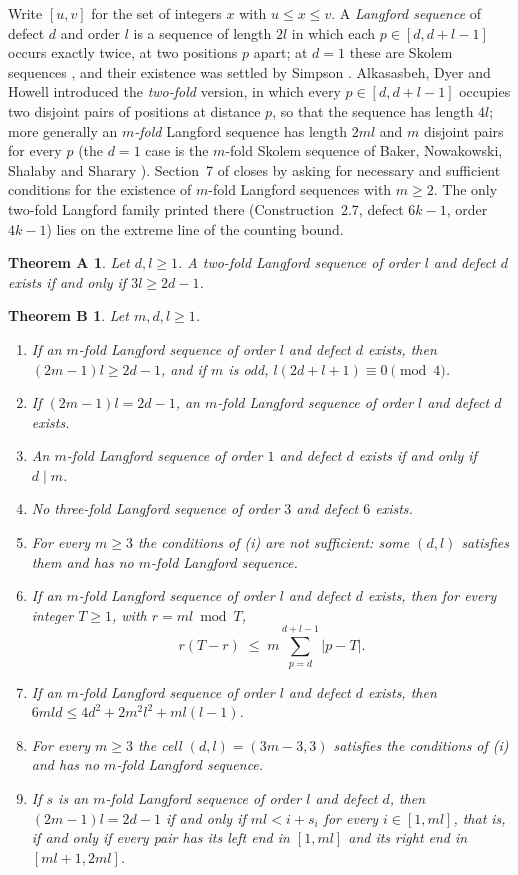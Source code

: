 \documentclass[11pt]{amsart}
\theoremstyle{plain}
\newtheorem*{thmA}{Theorem A}
\newtheorem*{thmB}{Theorem B}
\theoremstyle{definition}
\theoremstyle{remark}
\begin{document}
Write $[u,v]$ for the set of integers $x$ with $u \le x \le v$. A \emph{Langford
sequence} of defect $d$ and order $l$ is a sequence of length $2l$ in which each
$p \in [d,d+l-1]$ occurs exactly twice, at two positions $p$ apart; at $d = 1$ these are
Skolem sequences \cite{Skolem,OKeefe}, and their existence was settled by Simpson
\cite{Simpson}. Alkasasbeh, Dyer and Howell \cite{ADH} introduced the \emph{two-fold}
version, in which every $p \in [d,d+l-1]$ occupies two disjoint pairs of positions at
distance $p$, so that the sequence has length $4l$; more generally an \emph{$m$-fold}
Langford sequence has length $2ml$ and $m$ disjoint pairs for every $p$ (the $d = 1$ case
is the $m$-fold Skolem sequence of Baker, Nowakowski, Shalaby and Sharary \cite{BNSS}).
Section~7 of \cite{ADH} closes by asking for necessary and sufficient conditions for the
existence of $m$-fold Langford sequences with $m \ge 2$. The only
two-fold Langford family printed there (Construction~2.7, defect $6k-1$, order $4k-1$)
lies on the extreme line of the counting bound.

\begin{thmA}
Let $d, l \ge 1$. A two-fold Langford sequence of order $l$ and defect $d$ exists if and
only if $3l \ge 2d-1$.
\end{thmA}

\begin{thmB}
Let $m, d, l \ge 1$.
\begin{enumerate}
\item If an $m$-fold Langford sequence of order $l$ and defect $d$ exists, then
  $(2m-1)l \ge 2d-1$, and if $m$ is odd, $l(2d+l+1) \equiv 0 \pmod 4$.
\item If $(2m-1)l = 2d-1$, an $m$-fold Langford sequence of order $l$ and defect $d$
  exists.
\item An $m$-fold Langford sequence of order $1$ and defect $d$ exists if and only if
  $d \mid m$.
\item No three-fold Langford sequence of order $3$ and defect $6$ exists.
\item For every $m \ge 3$ the conditions of \textup{(i)} are not sufficient: some
  $(d,l)$ satisfies them and has no $m$-fold Langford sequence.
\item If an $m$-fold Langford sequence of order $l$ and defect $d$ exists, then for every
  integer $T \ge 1$, with $r = ml \bmod T$,
  \[
    r(T-r) \;\le\; m \sum_{p=d}^{d+l-1} |p - T| .
  \]
\item If an $m$-fold Langford sequence of order $l$ and defect $d$ exists, then
  $6mld \le 4d^2 + 2m^2l^2 + ml(l-1)$.
\item For every $m \ge 3$ the cell $(d,l) = (3m-3,3)$ satisfies the conditions of
  \textup{(i)} and has no $m$-fold Langford sequence.
\item If $s$ is an $m$-fold Langford sequence of order $l$ and defect $d$, then
  $(2m-1)l = 2d-1$ if and only if $ml < i + s_i$ for every $i \in [1,ml]$, that is, if
  and only if every pair has its left end in $[1,ml]$ and its right end in $[ml+1,2ml]$.
\end{enumerate}
\end{thmB}
\end{document}
